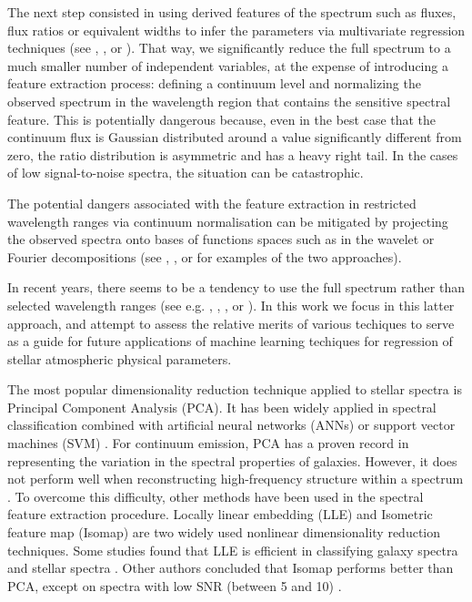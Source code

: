 \documentclass[a4paper,fleqn,usenatbib]{mnras}
\begin{document}
The next step consisted in using derived features of the spectrum such
as fluxes, flux ratios or equivalent widths to infer the parameters
via multivariate regression techniques (see
\cite{2006ApJ...636..804A}, \cite{2012ApJ...750L..37M}, or
\cite{2006A&A...456.1109M}). That way, we significantly reduce the
full spectrum to a much smaller number of independent variables, at
the expense of introducing a feature extraction process: defining a
continuum level and normalizing the observed spectrum in the
wavelength region that contains the sensitive spectral feature. This
is potentially dangerous because, even in the best case that the
continuum flux is Gaussian distributed around a value significantly
different from zero, the ratio distribution is asymmetric and has a
heavy right tail. In the cases of low signal-to-noise spectra, the
situation can be catastrophic.

The potential dangers associated with the feature extraction in
restricted wavelength ranges via continuum normalisation can be
mitigated by projecting the observed spectra onto bases of functions
spaces such as in the wavelet or Fourier decompositions (see
\cite{2010PASP..122..608M}, \cite{2015MNRAS.452.1394L}, or
\cite{2015ApJS..218....3L} for examples of the two approaches).

In recent years, there seems to be a tendency to use the full spectrum
rather than selected wavelength ranges (see
e.g. \cite{2014A&A...567A...5R}, \cite{2015ApJ...808...16N},
\cite{2015MNRAS.448.2717W}, or \cite{2015arXiv151000111R}). In this
work we focus in this latter approach, and attempt to assess the
relative merits of various techiques to serve as a guide for future
applications of machine learning techiques for regression of stellar
atmospheric physical parameters.

The most popular dimensionality reduction technique applied to stellar
spectra is Principal Component Analysis (PCA). It has been widely
applied in spectral classification combined with artificial neural
networks (ANNs) \citep{singh:98} or support vector machines (SVM)
\citep{fiorentin:08b}. For continuum emission, PCA has a proven record
in representing the variation in the spectral properties of
galaxies. However, it does not perform well when reconstructing
high-frequency structure within a spectrum \citep{vanderplas:09}. To
overcome this difficulty, other methods have been used in the spectral
feature extraction procedure. Locally linear embedding (LLE)
\citep{roweisLLE:00} and Isometric feature map (Isomap)
\citep{tenenbaum:00} are two widely used nonlinear dimensionality
reduction techniques. Some studies found that LLE is efficient in
classifying galaxy spectra \citep{vanderplas:09} and stellar spectra
\citep{daniel:11}. Other authors concluded that Isomap performs better
than PCA, except on spectra with low SNR (between 5 and 10)
\citep{bu:14}.
\end{document}
